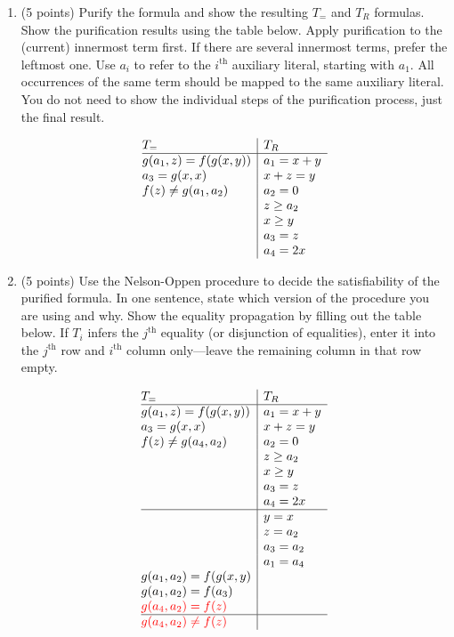 \documentclass{handout}
\begin{document}
\begin{questions}
\begin{enumerate}
\item (5 points) Purify the formula and show the resulting $T_=$ and $T_R$
formulas. Show the purification results using the table below. Apply
purification to the (current) innermost term first.  If there are several
innermost terms, prefer the leftmost one.  Use $a_i$ to refer to the
$i^\text{th}$ auxiliary literal, starting with $a_1$.  All occurrences of the
same term should be mapped to the same auxiliary literal. You do not need to
show the individual steps of the purification process, just the final result.

\[
\begin{array}{@{}l|l}
T_=           & T_R\\ \hline
 g(a_1,z) = f(g(x,y))& a_1 = x + y \\
 a_3 = g(x,x) & x + z = y \\
 f(z) \neq g(a_1,a_2)& a_2 = 0 \\
 & z \geq a_2 \\
 & x \geq y\\
 & a_3 = z\\
 & a_4 = 2x\\

\end{array}
\]



\item (5 points) Use the Nelson-Oppen procedure to decide the satisfiability of
the purified formula.  In one sentence, state which version of the procedure you
are using and why.  Show the equality propagation  by filling out the table
below.  If $T_i$ infers the $j^\text{th}$ equality (or disjunction of
equalities), enter it into the $j^\text{th}$ row and $i^\text{th}$ column
only---leave the remaining column in that row empty.

\[
\begin{array}{@{}l|l}
T_=           & T_R\\ \hline
 g(a_1,z) = f(g(x,y))& a_1 = x + y \\
 a_3 = g(x,x) & x + z = y \\
 f(z) \neq g(a_4,a_2)& a_2 = 0 \\
 & z \geq a_2 \\
 & x \geq y\\
 & a_3 = z\\
 & a_4 = 2x\\ \hline
 & y = x \\
 & z = a_2\\
 & a_3 = a_2\\
 & a_1 = a_4\\
 g(a_1, a_2) = f(g(x, y)& \\
 g(a_1, a_2) = f(a_3)& \\
 \textcolor{red}{g(a_4, a_2) = f(z)}& \\ \hline
 \textcolor{red}{g(a_4, a_2) \neq f(z)}& \\
\end{array}
\]



\end{enumerate}
\end{questions}
\end{document}
